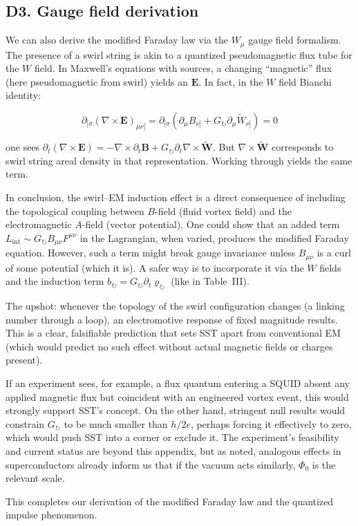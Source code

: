 \documentclass[10pt,reprint,aps,onecolumn,nofootinbib]{revtex4-2}
\begin{document}
\subsection*{D3. Gauge field derivation}

We can also derive the modified Faraday law via the $W_\mu$ gauge field formalism. The presence of a swirl string is akin to a quantized pseudomagnetic flux tube for the $W$ field. In Maxwell’s equations with sources, a changing ``magnetic'' flux (here pseudomagnetic from swirl) yields an $\mathbf{E}$. In fact, in the $W$ field Bianchi identity:

\begin{equation}
\partial_{[\sigma}(\nabla \times \mathbf{E})_{\mu\nu]} = \partial_{[\sigma}(\partial_\mu B_{\nu]} + G_{\circlearrowright} \partial_\mu \tilde{W}_{\nu]}) = 0
\end{equation}

one sees $\partial_t (\nabla \times \mathbf{E}) = -\nabla \times \partial_t \mathbf{B} + G_{\circlearrowright} \partial_t \nabla \times \tilde{\mathbf{W}}$. But $\nabla \times \tilde{\mathbf{W}}$ corresponds to swirl string areal density in that representation. Working through yields the same term.

In conclusion, the swirl--EM induction effect is a direct consequence of including the topological coupling between $B$-field (fluid vortex field) and the electromagnetic $A$-field (vector potential). One could show that an added term $L_{\text{int}} \sim G_{\circlearrowright} B_{\mu\nu} F^{\mu\nu}$ in the Lagrangian, when varied, produces the modified Faraday equation. However, such a term might break gauge invariance unless $B_{\mu\nu}$ is a curl of some potential (which it is). A safer way is to incorporate it via the $W$ fields and the induction term $b_{\circlearrowright} = G_{\circlearrowright}\partial_t \varrho_{\circlearrowright}$ (like in Table~III).

The upshot: whenever the topology of the swirl configuration changes (a linking number through a loop), an electromotive response of fixed magnitude results. This is a clear, falsifiable prediction that sets SST apart from conventional EM (which would predict no such effect without actual magnetic fields or charges present).

If an experiment sees, for example, a flux quantum entering a SQUID absent any applied magnetic flux but coincident with an engineered vortex event, this would strongly support SST’s concept. On the other hand, stringent null results would constrain $G_{\circlearrowright}$ to be much smaller than $h/2e$, perhaps forcing it effectively to zero, which would push SST into a corner or exclude it. The experiment’s feasibility and current status are beyond this appendix, but as noted, analogous effects in superconductors already inform us that if the vacuum acts similarly, $\Phi_0$ is the relevant scale.

This completes our derivation of the modified Faraday law and the quantized impulse phenomenon.




    
    
\end{document}
